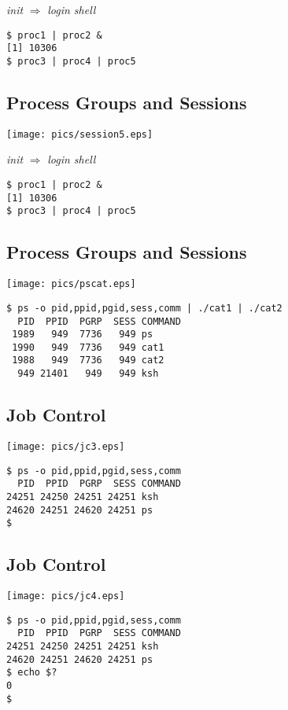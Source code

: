 \documentclass[xga]{xdvislides}
\begin{document}
{\em init} $\Rightarrow$ {\em login shell}
\begin{verbatim}
$ proc1 | proc2 &
[1] 10306
$ proc3 | proc4 | proc5

\end{verbatim}

\subsection{Process Groups and Sessions}
\begin{center}
	\texttt{[image: pics/session5.eps]}
\end{center}

{\em init} $\Rightarrow$ {\em login shell}
\begin{verbatim}
$ proc1 | proc2 &
[1] 10306
$ proc3 | proc4 | proc5
\end{verbatim}


\subsection{Process Groups and Sessions}
\begin{center}
	\texttt{[image: pics/pscat.eps]}
\end{center}
\begin{verbatim}
$ ps -o pid,ppid,pgid,sess,comm | ./cat1 | ./cat2
  PID  PPID  PGRP  SESS COMMAND
 1989   949  7736   949 ps
 1990   949  7736   949 cat1
 1988   949  7736   949 cat2
  949 21401   949   949 ksh
\end{verbatim}


\subsection{Job Control}
\begin{center}
	\texttt{[image: pics/jc3.eps]}
\end{center}
\addvspace{.5in}
\begin{verbatim}
$ ps -o pid,ppid,pgid,sess,comm
  PID  PPID  PGRP  SESS COMMAND
24251 24250 24251 24251 ksh
24620 24251 24620 24251 ps
$
\end{verbatim}

\subsection{Job Control}
\begin{center}
	\texttt{[image: pics/jc4.eps]}
\end{center}
\addvspace{.5in}
\begin{verbatim}
$ ps -o pid,ppid,pgid,sess,comm
  PID  PPID  PGRP  SESS COMMAND
24251 24250 24251 24251 ksh
24620 24251 24620 24251 ps
$ echo $?
0
$
\end{verbatim}
\end{document}
